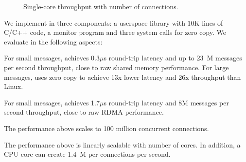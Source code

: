 \begin{figure}[t!]
\begin{minipage}{.31\textwidth}
		\caption{Single-core throughput with number of connections.}
		\label{fig:eval-connnum-tput}
	\end{minipage}
\end{figure}



We implement \sys in three components: a userspace library \libipc{} with 10K lines of C/C++ code, a monitor program and three system calls for zero copy. 
We evaluate \sys in the following aspects:

For small messages, \sys achieves 0.3$\mu$s round-trip latency and up to 23~M messages per second throughput, close to raw shared memory performance. For large messages, \sys uses zero copy to achieve 13x lower latency and 26x throughput than Linux.

For small messages, \sys achieves  1.7$\mu$s round-trip latency and 8M messages per second throughput, close to raw RDMA performance.

The performance above scales to 100 million concurrent connections.

The performance above is linearly scalable with number of cores. In addition, a CPU core can create 1.4~M per connections per second.

